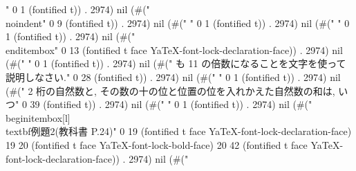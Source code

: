 {" 0 1 (fontified t)) . 2974) nil (#("\\noindent" 0 9 (fontified t)) . 2974) nil (#("
" 0 1 (fontified t)) . 2974) nil (#("
" 0 1 (fontified t)) . 2974) nil (#("\\end{itembox}" 0 13 (fontified t face YaTeX-font-lock-declaration-face)) . 2974) nil (#("
" 0 1 (fontified t)) . 2974) nil (#(" も 11 の倍数になることを文字を使って説明しなさい." 0 28 (fontified t)) . 2974) nil (#("
" 0 1 (fontified t)) . 2974) nil (#(" 2 桁の自然数と, その数の十の位と位置の位を入れかえた自然数の和は, いつ" 0 39 (fontified t)) . 2974) nil (#("
" 0 1 (fontified t)) . 2974) nil (#("\\begin{itembox}[l]{\\textbf{例題2}(教科書 P.24)}" 0 19 (fontified t face YaTeX-font-lock-declaration-face) 19 20 (fontified t face YaTeX-font-lock-bold-face) 20 42 (fontified t face YaTeX-font-lock-declaration-face)) . 2974) nil (#("
}
